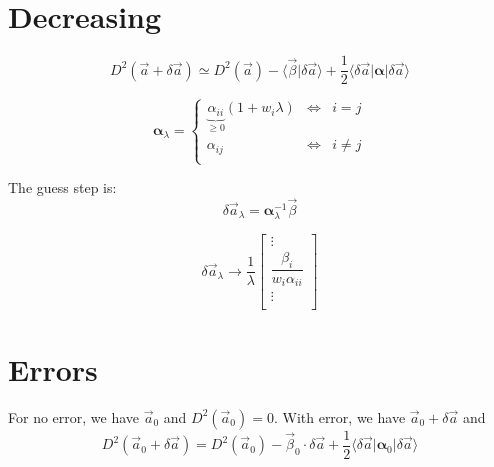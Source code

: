 \documentclass[aps,12pt]{revtex4}
\begin{document}
\section{Decreasing}

\begin{equation}
	 D^2(\vec{a} + \delta \vec{a}) \simeq 
	  D^2(\vec{a}) - \langle \vec{\beta} \vert \delta\vec{a} \rangle 
	  + \dfrac{1}{2} \langle \delta\vec{a} \vert \bm{\alpha}  \vert \delta\vec{a} \rangle 
\end{equation}


\begin{equation}
	\bm{\alpha}_\lambda =
	\left\lbrace
	\begin{array}{ccl}
	\underbrace{\alpha_{ii}}_{\geq0}(1+w_i\lambda) & \iff & i=j\\
	\alpha_{ij} & \iff & i \not= j \\
	\end{array}
	\right.
\end{equation}

The guess step is:
\begin{equation}
	\delta \vec{a}_\lambda = \bm{\alpha}_\lambda^{-1} \vec \beta
\end{equation}

\begin{equation}
	\delta \vec{a}_\lambda \to 
	\dfrac{1}{\lambda}
	\begin{bmatrix}
		\vdots\\
		\dfrac{ \beta_i }{w_i\alpha_{ii}}\\
		\vdots\\
	\end{bmatrix}
\end{equation}

\section{Errors}
For no error, we have $\vec{a}_0$ and $D^2(\vec{a}_0)=0$.
With error, we have $\vec{a}_0+\delta\vec{a}$ and 
\begin{equation}
D^2(\vec{a}_0+\delta\vec{a})=D^2(\vec{a}_0) - \vec{\beta}_0 \cdot \delta\vec{a} + \frac{1}{2} 
\langle \delta \vec{a} \vert \bm{\alpha}_0 \vert \delta \vec{a}\rangle
\end{equation}
\end{document}
